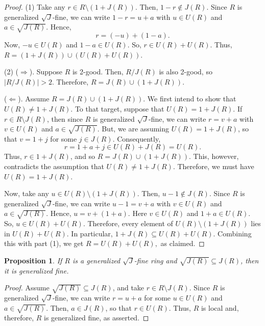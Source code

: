 \documentclass[12pt]{amsart}
\newtheorem{proposition}[theorem]{Proposition}
\theoremstyle{definition}
\begin{document}
\begin{proof}
(1) Take any \( r \in R \setminus (1 + J(R)) \). Then, \( 1 - r \not\in J(R) \). Since \( R \) is generalized \(\sqrt{J}\)-fine, we can write \( 1 - r = u + a \) with \( u \in U(R) \) and \( a \in \sqrt{J(R)} \). Hence,
	\[
	r = (-u) + (1 - a).
	\]
Now, \( -u \in U(R) \) and \( 1 - a \in U(R) \). So, \( r \in U(R) + U(R) \). Thus, \( R = (1 + J(R)) \cup (U(R) + U(R)) \).
	
(2) (\(\Rightarrow\)). Suppose \( R \) is 2-good. Then, \( R/J(R) \) is also 2-good, so \( |R/J(R)| > 2 \). Therefore, \( R = J(R) \cup (1 + J(R)) \).
	
(\(\Leftarrow\)). Assume \( R = J(R) \cup (1 + J(R)) \). We first intend to show that \( U(R) \neq 1 + J(R) \). To that target, suppose that \( U(R) = 1 + J(R) \). If \( r \in R \setminus J(R) \), then since \( R \) is generalized \(\sqrt{J}\)-fine, we can write \( r = v + a \) with \( v \in U(R) \) and \( a \in \sqrt{J(R)} \). But, we are assuming \( U(R) = 1 + J(R) \), so that \( v = 1 + j \) for some \( j \in J(R) \). Consequently,
\[
r = 1 + a + j\in U(R)+J(R)=U(R).
\]
Thus, \( r \in 1 + J(R) \), and so \( R = J(R) \cup (1 + J(R)) \). This, however, contradicts the assumption that \( U(R) \neq 1 + J(R) \). Therefore, we must have \( U(R) = 1 + J(R) \).

Now, take any \( u \in U(R) \setminus (1 + J(R)) \). Then, \( u - 1 \not\in J(R) \). Since \( R \) is generalized \(\sqrt{J}\)-fine, we can write \( u - 1 = v + a \) with \( v \in U(R) \) and \( a \in \sqrt{J(R)} \). Hence,
$
u = v + (1 + a).
$
Here \( v \in U(R) \) and \( 1 +a \in U(R) \). So, \( u \in U(R) + U(R) \). Therefore, every element of \( U(R) \setminus (1 + J(R)) \) lies in \( U(R) + U(R) \). In particular, \( 1 + J(R) \subseteq U(R) + U(R) \). Combining this with part (1), we get
$
R = U(R) + U(R),
$
as claimed.
\end{proof}

\begin{proposition}\label{2.5}
If \( R \) is a generalized \(\sqrt{J}\)-fine ring and \( \sqrt{J(R)} \subseteq J(R) \), then it is generalized fine.
\end{proposition}

\begin{proof}
Assume \( \sqrt{J(R)} \subseteq J(R) \), and take \( r \in R \setminus J(R) \). Since \( R \) is generalized \(\sqrt{J}\)-fine, we can write \( r = u + a \) for some \( u \in U(R) \) and \( a \in \sqrt{J(R)} \). Then, \( a \in J(R) \), so that \( r \in U(R) \). Thus, $R$ is local and, therefore, \( R \) is generalized fine, as asserted.
\end{proof}
\end{document}
